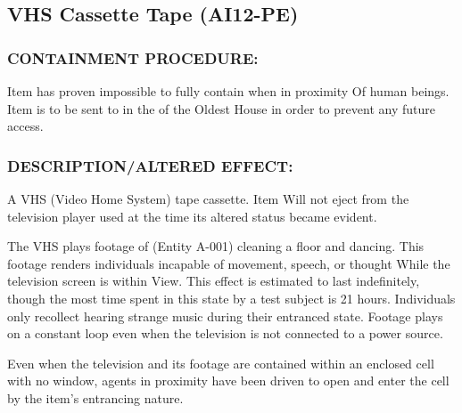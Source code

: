 \subsection*{VHS Cassette Tape (AI12-PE)}
\subsubsection*{CONTAINMENT PROCEDURE:}
\par Item has proven impossible to fully
contain when in proximity Of human
beings.
Item is to be sent to   in the 
of the Oldest House in order to prevent any future access.
\subsubsection*{DESCRIPTION/ALTERED EFFECT:}
\par A VHS (Video Home System) tape cassette. Item Will not eject
from the television player used at the time its altered status
became evident.
\par The VHS plays footage of  (Entity A-001) cleaning a floor and
dancing. This footage renders individuals incapable of movement,
speech, or thought While the television screen is within View. This
effect is estimated to last indefinitely, though the most time spent
in this state by a test subject is 21 hours. Individuals only recollect
hearing strange music during their entranced state. Footage plays
on a constant loop even when the television is not connected to a
power source.
\par Even when the television and its footage are contained within an
enclosed cell with no window, agents in proximity have been
driven to open and enter the cell by the item's entrancing nature.